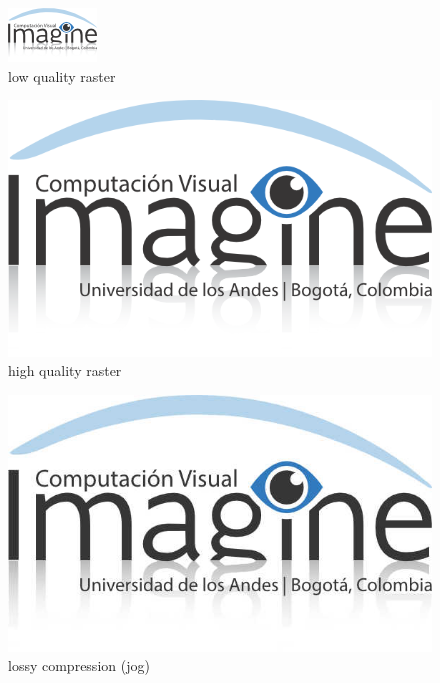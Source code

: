 \documentclass[10pt,twocolumn,letterpaper]{article}
\begin{document}
\begin{figure}[t]
\begin{center}
   \includegraphics[width=0.8\linewidth]{imagine_low.png}
\end{center}
   \caption{low quality raster}
\label{fig:long}
\label{fig:onecol}
\end{figure}

\begin{figure}[t]
\begin{center}
\includegraphics[width=0.8\linewidth]{imagine_high.png}
\end{center}
   \caption{high quality raster}
\label{fig:long}
\label{fig:onecol}
\end{figure}


\begin{figure}[t]
\begin{center}
\includegraphics[width=0.8\linewidth]{imagine.jpg}
\end{center}
   \caption{lossy compression (jog)}
\label{fig:long}
\label{fig:onecol}
\end{figure}
\end{document}
